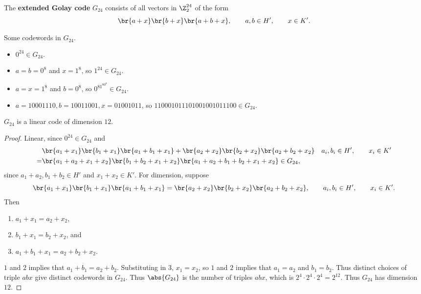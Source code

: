 \begin{definition*}
The \textbf{extended Golay code} $ G_{24} $ consists of all vectors in $ \Z_2^{24} $ of the form
$$ \br{a + x}\br{b + x}\br{a + b + x}, \qquad a, b \in H', \qquad x \in K'. $$
\end{definition*}

\begin{example*}
Some codewords in $ G_{24} $.
\begin{itemize}
\item $ 0^{24} \in G_{24} $.
\item $ a = b = 0^8 $ and $ x = 1^8 $, so $ 1^{24} \in G_{24} $.
\item $ a = x = 1^8 $ and $ b = 0^8 $, so $ 0^81^80^8 \in G_{24} $.
\item $ a = 10001110, b = 10011001, x = 01001011 $, so $ 110001011101001001011100 \in G_{24} $.
\end{itemize}
\end{example*}

\pagebreak

\begin{proposition}
$ G_{24} $ is a linear code of dimension $ 12 $.
\end{proposition}

\begin{proof}
Linear, since $ 0^{24} \in G_{24} $ and
\begin{align*}
& \br{a_1 + x_1}\br{b_1 + x_1}\br{a_1 + b_1 + x_1} + \br{a_2 + x_2}\br{b_2 + x_2}\br{a_2 + b_2 + x_2} & a_i, b_i \in H', \qquad x_i \in K' \\
= & \br{a_1 + a_2 + x_1 + x_2}\br{b_1 + b_2 + x_1 + x_2}\br{a_1 + a_2 + b_1 + b_2 + x_1 + x_2} \in G_{24},
\end{align*}
since $ a_1 + a_2, b_1 + b_2 \in H' $ and $ x_1 + x_2 \in K' $. For dimension, suppose
$$ \br{a_1 + x_1}\br{b_1 + x_1}\br{a_1 + b_1 + x_1} = \br{a_2 + x_2}\br{b_2 + x_2}\br{a_2 + b_2 + x_2}, \qquad a_i, b_i \in H', \qquad x_i \in K'. $$
Then
\begin{enumerate}
\item $ a_1 + x_1 = a_2 + x_2 $,
\item $ b_1 + x_1 = b_2 + x_2 $, and
\item $ a_1 + b_1 + x_1 = a_2 + b_2 + x_2 $.
\end{enumerate}
$ 1 $ and $ 2 $ implies that $ a_1 + b_1 = a_2 + b_2 $. Substituting in $ 3 $, $ x_1 = x_2 $, so $ 1 $ and $ 2 $ implies that $ a_1 = a_2 $ and $ b_1 = b_2 $. Thus distinct choices of triple $ abx $ give distinct codewords in $ G_{24} $. Thus $ \abs{G_{24}} $ is the number of triples $ abx $, which is $ 2^4 \cdot 2^4 \cdot 2^4 = 2^{12} $. Thus $ G_{24} $ has dimension $ 12 $.
\end{proof}


